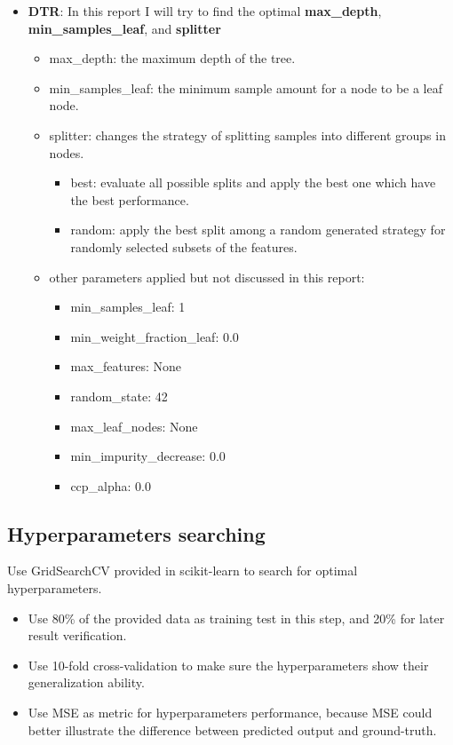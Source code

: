 \documentclass[a4paper]{article}
\begin{document}
\begin{itemize}
    \item \textbf{DTR}: In this report I will try to find the optimal \textbf{max\_depth}, \textbf{min\_samples\_leaf}, and \textbf{splitter}
    \begin{itemize}
        \item max\_depth: the maximum depth of the tree.
        \item min\_samples\_leaf: the minimum sample amount for a node to be a leaf node.
        \item splitter: changes the strategy of splitting samples into different groups in nodes.
        \begin{itemize}
            \item best: evaluate all possible splits and apply the best one which have the best performance.
            \item random: apply the best split among a random generated strategy for randomly selected subsets of the features.
        \end{itemize}
        \item other parameters applied but not discussed in this report: 
        \begin{itemize}
            \item min\_samples\_leaf: 1
            \item min\_weight\_fraction\_leaf: 0.0
            \item max\_features: None
            \item random\_state: 42
            \item max\_leaf\_nodes: None
            \item min\_impurity\_decrease: 0.0
            \item ccp\_alpha: 0.0
        \end{itemize}
    \end{itemize}
\end{itemize}

\subsection{Hyperparameters searching}

\label{sec:HyperparametersSearching}

Use GridSearchCV provided in scikit-learn to search for optimal hyperparameters.

\begin{itemize}
    \item Use 80\% of the provided data as training test in this step, and 20\% for later result verification.
    \item Use 10-fold cross-validation to make sure the hyperparameters show their generalization ability.
    \item Use MSE as metric for hyperparameters performance, because MSE could better illustrate the difference between predicted output and ground-truth.
\end{itemize}
\end{document}
